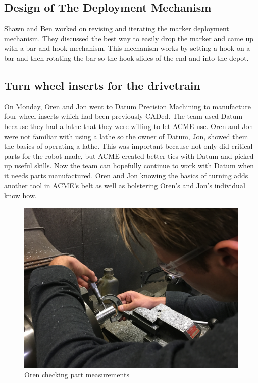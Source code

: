 \documentclass{article}
\newif\ifcontents
\begin{document}
\contentsfalse

\subsection{Design of The Deployment Mechanism}
Shawn and Ben worked on revising and iterating the marker deployment mechanism. They discussed the best way to easily drop the marker and came up with a bar and hook mechanism. This mechanism works by setting a hook on a bar and then rotating the bar so the hook slides of the end and into the depot.

\subsection{Turn wheel inserts for the drivetrain}
On Monday, Oren and Jon went to Datum Precision Machining to manufacture four wheel inserts which had been previously CADed. The team used Datum because they had a lathe that they were willing to let ACME use. Oren and Jon were not familiar with using a lathe so the owner of Datum, Jon, showed them the basics of operating a lathe. This was important because not only did critical parts for the robot made, but ACME created better ties with Datum and picked up useful skills. Now the team can hopefully continue to work with Datum when it needs parts manufactured. Oren and Jon knowing the basics of turning adds another tool in ACME’s belt as well as bolstering Oren’s and Jon’s individual know how.

\begin{figure}
    \centering
    \includegraphics[width=.6 \textwidth]{08_10-22/images/IMG_0330.JPG}
    \caption{Oren checking part measurements}
    \label{fig: Turning Inserts}
\end{figure}
\end{document}

